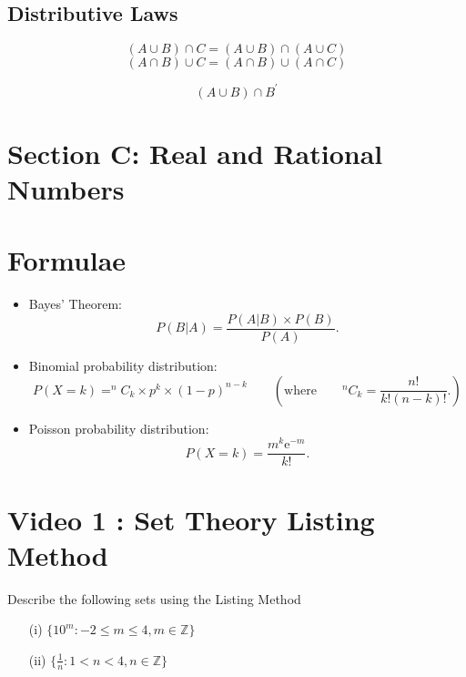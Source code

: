\documentclass[]{report}
\begin{document}
\subsection*{Distributive Laws}
\[ (A \cup B) \cap C =  (A \cup B) \cap (A \cup C)  \]
\[ (A \cap B) \cup C =  (A \cap B) \cup (A \cap C)  \]


\[ (A \cup B) \cap B^{\prime} \]
\section*{Section C: Real and Rational Numbers}

\newpage
\section*{Formulae}
\begin{itemize}




\item Bayes' Theorem:
\begin{equation*}
P(B|A)=\frac{P\left(A|B\right) \times P(B) }{P\left( A\right) }.
\end{equation*}



\item Binomial probability distribution:
\begin{equation*}
P(X = k) = ^{n}C_{k} \times p^{k} \times \left( 1-p\right) ^{n-k}\qquad \left( \text{where}\qquad
^{n}C_{k} =\frac{n!}{k!\left(n-k\right) !}. \right)
\end{equation*}

\item Poisson probability distribution:
\begin{equation*}
P(X = k) =\frac{m^{k}\mathrm{e}^{-m}}{k!}.
\end{equation*}
\end{itemize}

\section{Video 1 :  Set Theory Listing Method}


Describe the following sets using the Listing Method

\begin{itemize}
\item[(i)] $ \{ 10^m : -2 \leq m \leq 4, m \in \mathbb{Z} \} $
\item[(ii)]  $ \{ \frac{1}{n}: 1 < n < 4, n \in \mathbb{Z} \} $
\end{itemize}
\end{document}
